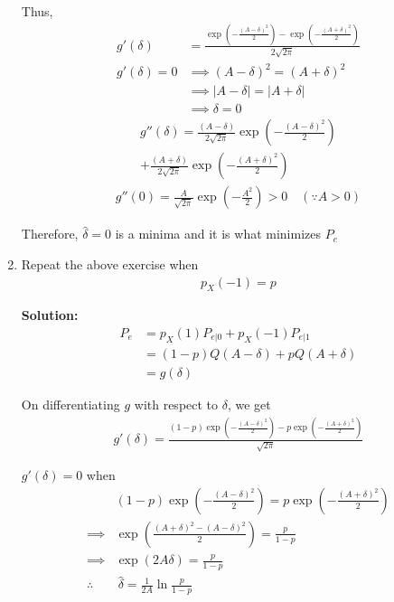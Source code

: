 \documentclass[journal,12pt,twocolumn]{IEEEtran}
\newcommand{\solution}{\noindent \textbf{Solution: }}
\providecommand{\brak}[1]{\ensuremath{\left(#1\right)}}
\numberwithin{equation}{section}
\renewcommand\thesection{\arabic{section}}
\begin{document}
\begin{enumerate}[label=\thesection.\arabic*,ref=\thesection.\theenumi]
	Thus,
	\begin{align}
		g'(\delta) &= \frac{\exp\brak{-\frac{(A-\delta)^2}{2}} - \exp\brak{-\frac{(A+\delta)^2}{2}}}{2\sqrt{2\pi}} \\
		g'(\delta) = 0 &\implies (A-\delta)^2 = (A+\delta)^2 \\
		&\implies |A-\delta| = |A+\delta| \\
		&\implies \delta = 0
	\end{align}
	\begin{multline}
		g''(\delta) = \frac{(A-\delta)}{2\sqrt{2\pi}} \exp\brak{-\frac{(A-\delta)^2}{2}} \\+ \frac{(A+\delta)}{2\sqrt{2\pi}} \exp\brak{-\frac{(A+\delta)^2}{2}}
	\end{multline}
	\begin{align}
		g''(0) = \frac{A}{\sqrt{2\pi}} \exp\brak{-\frac{A^2}{2}} > 0 \quad (\because A>0)
	\end{align}
	
	Therefore, $\hat{\delta} = 0$ is a minima and it is what minimizes $P_e$
	
	\item Repeat the above exercise when 
	\begin{align}
		p_{X}(-1) = p
	\end{align}
	
	\solution	
	\begin{align}
		P_e &= p_X(1) P_{e|0} + p_X(-1) P_{e|1} \\
		&= (1-p) Q(A-\delta) + p Q(A+\delta) \\
		&= g(\delta)
	\end{align}
	
	On differentiating $g$ with respect to $\delta$, we get
	\begin{align}
		g'(\delta) = \frac{(1-p)\exp\brak{-\frac{(A-\delta)^2}{2}} - p\exp\brak{-\frac{(A+\delta)^2}{2}}}{\sqrt{2\pi}} 
	\end{align}
	
	$g'(\delta) = 0$ when
	\begin{align}
			&(1-p)\exp\brak{-\frac{(A-\delta)^2}{2}} = p\exp\brak{-\frac{(A+\delta)^2}{2}} \\
			\implies &\exp\brak{\frac{(A+\delta)^2 - (A-\delta)^2}{2}} = \frac{p}{1-p} \\
			\implies &\exp\brak{2A\delta} = \frac{p}{1-p} \\
			\therefore &~\hat{\delta} = \frac{1}{2A} \ln\frac{p}{1-p}
	\end{align}
	

\end{enumerate}
\end{document}
